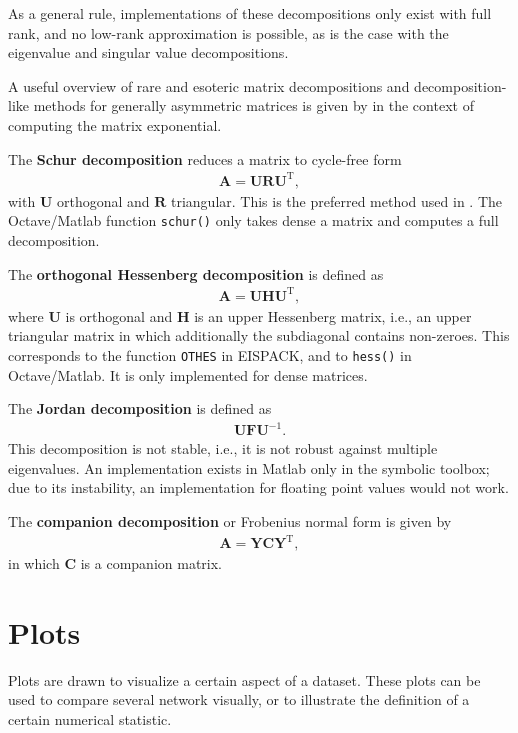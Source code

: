 \documentclass{article}
\begin{document}
As a general rule, implementations of these decompositions only exist
with full rank, and no low-rank approximation is possible, as is the
case with the eigenvalue and singular value decompositions. 

A useful overview of rare and esoteric matrix decompositions and
decomposition-like methods for generally asymmetric matrices is given by
\cite{b136} in the context of computing the matrix exponential. 

The \textbf{Schur decomposition}
 reduces a matrix to cycle-free form
\begin{align}
  \mathbf A = \mathbf U \mathbf R \mathbf U^{\mathrm T},
\end{align}
with $\mathbf U$ orthogonal and $\mathbf R$ triangular.  
This is the preferred method used in \citep{b136}. 
The Octave/Matlab function \texttt{schur()} only takes dense a matrix and
computes a full decomposition. 

The \textbf{orthogonal Hessenberg decomposition} \citep{b139} is defined
as
\begin{align}
  \mathbf A = \mathbf U \mathbf H \mathbf U^{\mathrm T},
\end{align}
where $\mathbf U$ is orthogonal and $\mathbf H$ is an upper Hessenberg
matrix, i.e., an upper triangular matrix in which additionally the
subdiagonal contains non-zeroes.  This corresponds to the function
\texttt{OTHES} in EISPACK, and to \texttt{hess()} in Octave/Matlab.  It
is only implemented for dense matrices. 

The \textbf{Jordan decomposition} is defined as
\begin{align}
  \textbf{U} \textbf{F} \textbf{U}^{-1}.
\end{align}
This decomposition is not stable, i.e., it is not robust against
multiple eigenvalues. 
An implementation exists in Matlab only in the symbolic toolbox; due to its
instability, an implementation for floating point values would not
work. 

The \textbf{companion decomposition} or Frobenius normal form
\citep[p.\ 19]{b136} is given by
\begin{align}
  \mathbf A = \mathbf Y \mathbf C \mathbf Y^{\mathrm T},
\end{align} 
in which $\mathbf C$ is a companion matrix.

\section{Plots}
\label{sec:plots}
Plots are drawn to visualize a certain aspect of a dataset. These plots
can be used to compare several network visually, or to illustrate the
definition of a certain numerical statistic.
\end{document}
